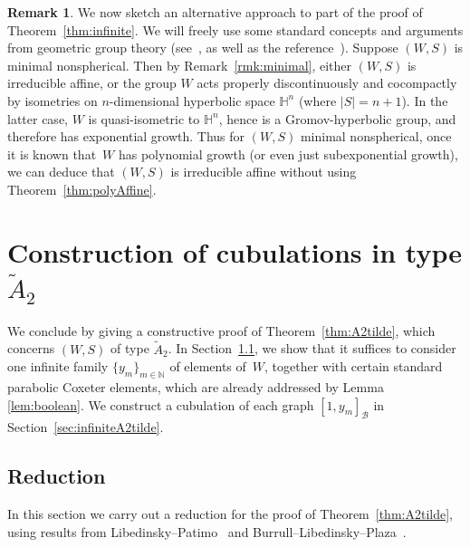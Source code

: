 \documentclass[11pt]{amsart}
\theoremstyle{plain}
\theoremstyle{definition}
\newtheorem{rmk}[thm]{Remark}
\newcommand{\N}{\mathbb{N}}
\newcommand{\cB}{\mathcal B}
\numberwithin{equation}{subsection}
\begin{document}
\begin{rmk}\label{rmk:hyp} We now sketch an alternative approach to part of the proof of Theorem~\ref{thm:infinite}. We will freely use some standard concepts and arguments from geometric group theory (see~\cite{Loeh}, as well as the reference~\cite{BridsonHaefliger}). Suppose $(W,S)$ is minimal nonspherical. Then by Remark~\ref{rmk:minimal}, either $(W,S)$ is irreducible affine, or the group $W$ acts properly discontinuously and cocompactly by isometries on $n$-dimensional hyperbolic space $\mathbb{H}^{n}$ (where $|S| = n+1$). In the latter case, $W$ is quasi-isometric to $\mathbb{H}^n$, hence is a Gromov-hyperbolic group, and therefore has exponential growth. Thus for $(W,S)$ minimal nonspherical, once it is known that~$W$ has polynomial growth (or even just subexponential growth), we can deduce that $(W,S)$ is irreducible affine without using Theorem~\ref{thm:polyAffine}.
\end{rmk}



\section{Construction of cubulations in type \texorpdfstring{$\tilde{A}_2$}{\~A2}}\label{sec:A2tilde}

We conclude by giving a constructive proof of Theorem~\ref{thm:A2tilde}, which concerns  $(W,S)$ of type $\tilde{A}_2$. In Section~\ref{sec:reduction}, we show that it suffices to consider one infinite family $\{ y_m \}_{m \in \N}$ of elements of~$W$, together with certain standard parabolic Coxeter elements, which are already addressed by Lemma \ref{lem:boolean}. We construct a cubulation of each graph $[1,y_m]_\cB$ in Section~\ref{sec:infiniteA2tilde}.

\subsection{Reduction}\label{sec:reduction}

In this section we carry out a reduction for the proof of Theorem~\ref{thm:A2tilde}, using results from Libedinsky--Patimo~\cite{LibedinskyPatimo} and Burrull--Libedinsky--Plaza~\cite{BurrullLibedinskyPlaza}. 
\end{document}
